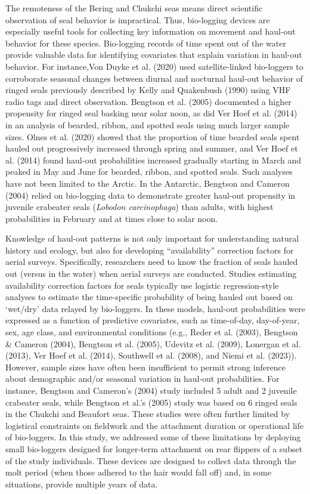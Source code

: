 \documentclass[fleqn,10pt,lineno]{wlpeerj} %
\begin{document}
The remoteness of the Bering and Chukchi seas means direct scientific
observation of seal behavior is impractical. Thus, bio-logging devices are
especially useful tools for collecting key information on movement and haul-out
behavior for these species. Bio-logging records of time spent out of the water
provide valuable data for identifying covariates that explain variation in
haul-out behavior. For instance,Von Duyke et al. (2020) used
satellite-linked bio-loggers to corroborate seasonal changes between diurnal and
nocturnal haul-out behavior of ringed seals previously described by Kelly and
Quakenbush (1990) using VHF radio tags and direct observation. Bengtson
et al. (2005) documented a higher propensity for ringed seal basking
near solar noon, as did Ver Hoef et al. (2014) in an analysis of
bearded, ribbon, and spotted seals using much larger sample sizes. Olnes et al.
(2020) showed that the proportion of time bearded seals spent hauled out
progressively increased through spring and summer, and Ver Hoef et al.
(2014) found haul-out probabilities increased gradually starting in
March and peaked in May and June for bearded, ribbon, and spotted seals. Such
analyses have not been limited to the Arctic. In the Antarctic, Bengtson and
Cameron (2004) relied on bio-logging data to demonstrate greater
haul-out propensity in juvenile crabeater seals (\emph{Lobodon carcinophaga}) than
adults, with highest probabilities in February and at times close to solar noon.

Knowledge of haul-out patterns is not only important for understanding natural
history and ecology, but also for developing ``availability'' correction factors
for aerial surveys. Specifically, researchers need to know the fraction of seals
hauled out (versus in the water) when aerial surveys are conducted. Studies
estimating availability correction factors for seals typically use logistic
regression-style analyses to estimate the time-specific probability of being
hauled out based on `wet/dry' data relayed by bio-loggers. In these models,
haul-out probabilities were expressed as a function of predictive covariates,
such as time-of-day, day-of-year, sex, age class, and environmental conditions
(e.g., Reder et al. (2003), Bengtson \& Cameron (2004), Bengtson et al. (2005), Udevitz et al. (2009), Lonergan et al. (2013),
Ver Hoef et al. (2014), Southwell et al. (2008), and Niemi et al. (2023)). However, sample sizes have often been
insufficient to permit strong inference about demographic and/or seasonal
variation in haul-out probabilities. For instance, Bengtson and Cameron's
(2004) study included 5 adult and 2 juvenile crabeater seals, while
Bengtson et al.'s (2005) study was based on 6 ringed seals in the
Chukchi and Beaufort seas. These studies were often further limited by
logistical constraints on fieldwork and the attachment duration or operational
life of bio-loggers. In this study, we addressed some of these limitations by
deploying small bio-loggers designed for longer-term attachment on rear flippers
of a subset of the study individuals. These devices are designed to collect data
through the molt period (when those adhered to the hair would fall off) and, in
some situations, provide multiple years of data.
\end{document}
